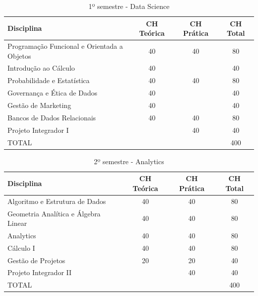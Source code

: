\documentclass[a4paper, 12pt, openright, oneside, german, french, english, brazil]{abntex2}
\begin{document}
\begin{table}[!h]
  \centering
  \footnotesize
  \caption{1º semestre - Data Science}
  \label{1sem}
  \begin{tabular}{|p{6cm}|c|c|c|}
    \hline
    \textbf{Disciplina} & CH Teórica & CH Prática & CH Total \\
    \hline
    Programação Funcional e Orientada a Objetos & 40 & 40 & 80 \\
    \hline
    Introdução ao Cálculo & 40 & & 40 \\
    \hline
    Probabilidade e Estatística & 40 & 40 & 80 \\
    \hline
    Governança e Ética de Dados & 40 & & 40 \\
    \hline
    Gestão de Marketing & 40 & & 40 \\
    \hline
    Bancos de Dados Relacionais & 40 & 40 & 80 \\
    \hline
    Projeto Integrador I & & 40 & 40 \\
    \hline
    TOTAL & & & 400 \\
    \hline
  \end{tabular}
\end{table}

\begin{table}[!h]
  \footnotesize
  \centering
  \caption{2º semestre - Analytics}
  \label{2sem}
  \begin{tabular}{|p{6cm}|c|c|c|}
    \hline
    \textbf{Disciplina} & CH Teórica & CH Prática & CH Total \\
    \hline
    Algoritmo e Estrutura de Dados & 40 & 40 & 80 \\
    \hline
    Geometria Analítica e Álgebra Linear & 40 & 40 & 80 \\
    \hline
    Analytics & 40 & 40 & 80 \\
    \hline
    Cálculo I & 40 & 40 & 80 \\
    \hline
    Gestão de Projetos & 20 & 20 & 40 \\
    \hline
    Projeto Integrador II & & 40 & 40 \\
    \hline
    TOTAL & & & 400 \\
    \hline
  \end{tabular}
\end{table}
\end{document}
